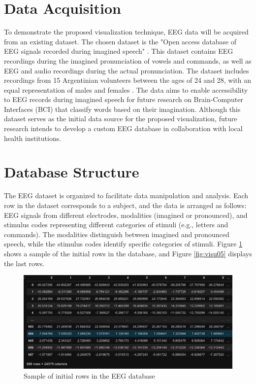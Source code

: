 \documentclass[format=acmtog]{acmart}
\begin{document}
	\section{Data Acquisition}
	\par To demonstrate the proposed visualization technique, EEG data will be acquired from an existing dataset. The chosen dataset is the "Open access database of EEG signals recorded during imagined speech" \cite{10.1117/12.2255697}. This dataset contains EEG recordings during the imagined pronunciation of vowels and commands, as well as EEG and audio recordings during the actual pronunciation. The dataset includes recordings from 15 Argentinian volunteers between the ages of 24 and 28, with an equal representation of males and females \cite{10.1117/12.2255697}. The data aims to enable accessibility to EEG records during imagined speech for future research on Brain-Computer Interfaces (BCI) that classify words based on their imagination. Although this dataset serves as the initial data source for the proposed visualization, future research intends to develop a custom EEG database in collaboration with local health institutions.
	
	\section{Database Structure}
	The EEG dataset is organized to facilitate data manipulation and analysis. Each row in the dataset corresponds to a subject, and the data is arranged as follows: EEG signals from different electrodes, modalities (imagined or pronounced), and stimulus codes representing different categories of stimuli (e.g., letters and commands). The modalities distinguish between imagined and pronounced speech, while the stimulus codes identify specific categories of stimuli. Figure \ref{fig:visu04} shows a sample of the initial rows in the database, and Figure \ref{fig:visu05} displays the last rows.
	
	\begin{figure}
		\centering
		\includegraphics[width=\linewidth]{../presentation/images/visu04}
		\caption{Sample of initial rows in the EEG database}
		\label{fig:visu04}
	\end{figure}
	
\end{document}
